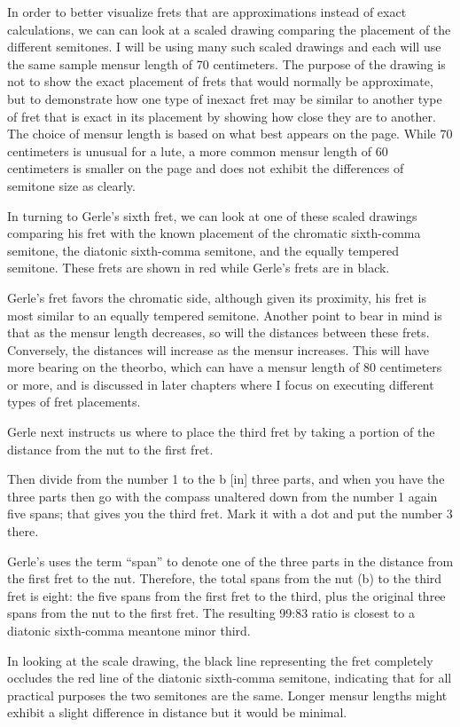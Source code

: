 In order to better visualize frets that are approximations instead of exact calculations, we can can look at a scaled
drawing comparing the placement of the different semitones. I will be using many such scaled drawings and each will use
the same sample mensur length of 70 centimeters. The purpose of the drawing is not to show the exact placement of frets
that would normally be approximate, but to demonstrate how one type of inexact fret may be similar to another type of
fret that is exact in its placement by showing how close they are to another. The choice of mensur length is based on
what best appears on the page. While 70 centimeters is unusual for a lute, a more common mensur length of 60
centimeters is smaller on the page and does not exhibit the differences of semitone size as clearly.

In turning to Gerle's sixth fret, we can look at one of these scaled drawings comparing
his fret with the known placement of the chromatic sixth-comma semitone, the diatonic
sixth-comma semitone, and the equally tempered semitone. These frets are shown in red
while Gerle's frets are in black.

Gerle's fret favors the chromatic side, although given its proximity, his fret is most similar to
an equally tempered semitone. Another point to bear in mind is that as the mensur length decreases,
so will the distances between these frets. Conversely, the distances will increase as the mensur
increases. This will have more bearing on the theorbo, which can have a mensur length of 80 centimeters
or more, and is discussed in later chapters where I focus on executing different types of fret
placements. 

Gerle next instructs us where to place the third fret by taking a portion of the 
distance from the nut to the first fret.
\begin{blocks}
Then divide from the number 1 to the b [in] three parts, and when you have the
three parts then go with the compass unaltered down from the number 1 again five
spans; that gives you the third fret. Mark it with a dot and put the number 3
there.
\end{blocks}
Gerle's uses the term ``span'' to denote one of the three parts in the distance from
the first fret to the nut. Therefore, the total spans from the nut (b) to the third fret 
is eight: the five spans
from the first fret to the third, plus the original three spans from the nut to
the first fret. The resulting 99:83 ratio is closest to a diatonic sixth-comma
meantone minor third.

In looking at the scale drawing, the black line representing the fret completely
occludes the red line of the diatonic sixth-comma semitone, indicating that for all
practical purposes the two semitones are the same. Longer mensur lengths might exhibit
a slight difference in distance but it would be minimal.

